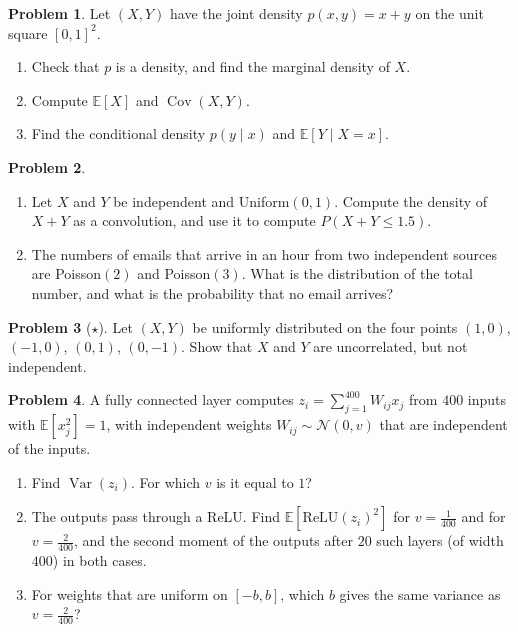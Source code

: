 \documentclass[11pt]{article}
\theoremstyle{definition}
\newtheorem{problem}{Problem}[section]
\newcommand{\E}{\mathbb{E}}
\DeclareMathOperator{\Var}{Var}
\DeclareMathOperator{\Cov}{Cov}
\begin{document}
\begin{problem}\label{pr:continuous-joint}
    Let $(X, Y)$ have the joint density $p(x, y) = x + y$ on the unit square $[0, 1]^2$.
    \begin{enumerate}[label=(\alph*)]
        \item Check that $p$ is a density, and find the marginal density of $X$.
        \item Compute $\E[X]$ and $\Cov(X, Y)$.
        \item Find the conditional density $p(y \mid x)$ and $\E[Y \mid X = x]$.
    \end{enumerate}
\end{problem}

\begin{problem}\label{pr:convolution}
    \begin{enumerate}[label=(\alph*)]
        \item Let $X$ and $Y$ be independent and Uniform$(0, 1)$. Compute the density of $X + Y$ as a convolution, and use it to compute $P(X + Y \leq 1.5)$.
        \item The numbers of emails that arrive in an hour from two independent sources are Poisson$(2)$ and Poisson$(3)$. What is the distribution of the total number, and what is the probability that no email arrives?
    \end{enumerate}
\end{problem}

\begin{problem}[$\star$]\label{pr:uncorrelated-dependent}
    Let $(X, Y)$ be uniformly distributed on the four points $(1, 0)$, $(-1, 0)$, $(0, 1)$, $(0, -1)$. Show that $X$ and $Y$ are uncorrelated, but not independent.
\end{problem}

\begin{problem}\label{pr:init-layer}
    A fully connected layer computes $z_i = \sum_{j=1}^{400} W_{ij}x_j$ from $400$ inputs with $\E[x_j^2] = 1$, with independent weights $W_{ij} \sim \mathcal{N}(0, v)$ that are independent of the inputs.
    \begin{enumerate}[label=(\alph*)]
        \item Find $\Var(z_i)$. For which $v$ is it equal to $1$?
        \item The outputs pass through a ReLU. Find $\E[\mathrm{ReLU}(z_i)^2]$ for $v = \frac{1}{400}$ and for $v = \frac{2}{400}$, and the second moment of the outputs after $20$ such layers (of width $400$) in both cases.
        \item For weights that are uniform on $[-b, b]$, which $b$ gives the same variance as $v = \frac{2}{400}$?
    \end{enumerate}
\end{problem}
\end{document}
